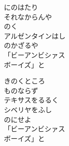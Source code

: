 \documentclass[10pt,b5j]{tarticle} %
\begin{document}
\begin{enumerate}
\begin{minipage}[c]{\blocksize}
        \vspace{\linespace}
        \item
        にのはたり\\
        それなからんや\\
        のく\\
        アルゼンタインはし\\
        のかざるや\\
        「ビーアンビシァス\\
        ボーイズ」と
        
        \vspace{\linespace}
        \item
        きのくところ\\
        ものならず\\
        テキサスをるるく\\
        シベリヤをふし\\
        のにせよ\\
        「ビーアンビシァス\\
        ボーイズ」と
    
    \end{minipage}
\end{enumerate} %
\end{document}
